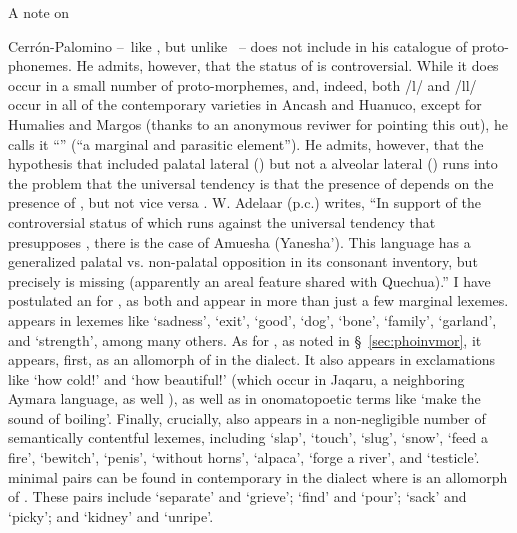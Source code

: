 A note on  {Cerrón-Palomino --~like \citep{torero1964dialectos}, but unlike \citet{Parker69}~-- does not include  in his catalogue of proto-phonemes. He admits, however, that the status of  is controversial. While it does occur in a small number of proto-morphemes, and, indeed, both /l/ and /ll/ occur in all of the \QI{} contemporary varieties in Ancash and Huanuco, except for Humalies and Margos (thanks to an anonymous reviwer for pointing this out), he calls it “” (“a marginal and parasitic element”). He admits, however, that the hypothesis that \PQ{} included palatal lateral () but not a alveolar lateral () runs into the problem that the universal tendency is that the presence of  depends on the presence of , but not vice versa \citet[123]{CerroP87}. W. Adelaar (p.c.) writes, “In support of the controversial status of  which runs against the universal tendency that  presupposes , there is the case of Amuesha (Yanesha’). This language has a generalized palatal vs. non-palatal opposition in its consonant inventory, but precisely  is missing (apparently an areal feature shared with Quechua).” I have postulated an  for \SYQ, as both \textipa{[λ]} and \textipa{[l]} appear in more than just a few marginal lexemes. \textipa{[λ]} appears in \SYQ{} lexemes like  ‘sadness’,  ‘exit’,  ‘good’,  ‘dog’,  ‘bone’,  ‘family’,  ‘garland’, and  ‘strength’, among many others. As for \textipa{[l]}, as noted in §~\ref{sec:phoinvmor}, it appears, first, as an allomorph of  in the \CH{} dialect. It also appears in exclamations like  ‘how cold!’ and  ‘how beautiful!’ (which occur in Jaqaru, a neighboring Aymara language, as well \citealt{Castro95}), as well as in onomatopoetic terms like  ‘make the sound of boiling’. Finally, crucially, \textipa{[l]} also appears in a non-negligible number of semantically contentful lexemes, including  ‘slap’,  ‘touch’,  ‘slug’,  ‘snow’,  ‘feed a fire’,  ‘bewitch’,  ‘penis’,  ‘without horns’,  ‘alpaca’,  ‘forge a river’, and  ‘testicle’. \textipa{[l]/[λ]} minimal pairs can be found in contemporary \SYQ{} in the \CH{} dialect where \textipa{[l]} is an allomorph of . These pairs include  ‘separate’ and  ‘grieve’;  ‘find’ and  ‘pour’;  ‘sack’ and  ‘picky’; and  ‘kidney’ and  ‘unripe’.

}
